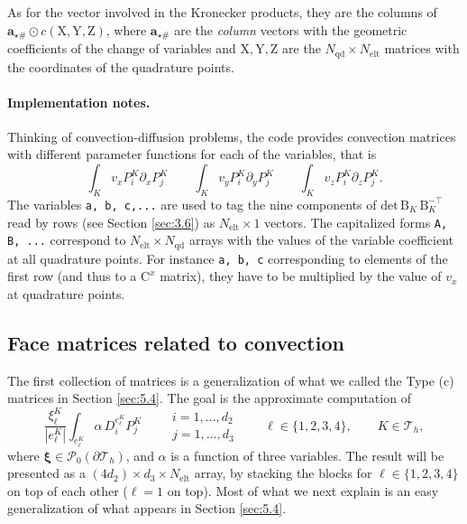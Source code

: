 \documentclass[10pt,english]{article}
\newcommand{\Nelt}{{N_{\mathrm{elt}}}}
\newcommand{\Nnd}{{N_{\mathrm{qd}}}}
\begin{document}
As for the vector involved in the Kronecker products, they are the columns of $\mathbf a_{\star\#} \odot c(\mathrm X,\mathrm Y,\mathrm Z)$, where $\mathbf a_{\star\#}$ are the {\em column} vectors with the geometric coefficients of the change of variables and $\mathrm X,\mathrm Y,\mathrm Z$ are the $\Nnd\times\Nelt$ matrices with the coordinates of the quadrature points.

\paragraph{Implementation notes.}
Thinking of convection-diffusion problems, the code provides convection matrices with different parameter functions for each of the variables, that is
\[
\int_K v_x P_i^K \partial_x P_j^K \qquad \int_K v_y P_i^K \partial_y P_j^K\qquad \int_K v_z P_i^K \partial_z P_j^K.
\]
The variables {\tt a, b, c,...} are used to tag the nine components of $\mathrm{det}\,\mathrm B_K\, \mathrm B_K^{-\top}$ read by rows (see Section \ref{sec:3.6}) as $\Nelt\times 1$ vectors. The capitalized forms {\tt A, B, ...} correspond to $\Nelt\times\Nnd$ arrays with the values of the variable coefficient at all quadrature points. For instance {\tt a, b, c} corresponding to elements of the first row (and thus to a $\mathrm C^x$ matrix), they have to be multiplied by the value of $v_x$ at quadrature points.




\subsection{Face matrices related to convection}

The first collection of matrices is a generalization of what we called the Type (c) matrices in Section \ref{sec:5.4}. The goal is the approximate computation of
\[
\frac{\xi^K_\ell}{|e^K_\ell|} \int_{e^K_\ell}\alpha\, D_i^{e^K_\ell} P_j^K \qquad \begin{array}{c} i=1,\ldots,d_2\\ j=1,\ldots,d_3\end{array}\qquad \ell\in \{1,2,3,4\}, \qquad K \in \mathcal T_h,
\]
where $\boldsymbol\xi\in \mathcal P_0(\partial \mathcal T_h)$, and $\alpha$ is a function of three variables. The result will be presented as a $(4d_2)\times d_3\times \Nelt$ array, by stacking the blocks for $\ell\in\{1,2,3,4\}$ on top of each other ($\ell=1$ on top). Most of what we next explain is an easy generalization of what appears in Section \ref{sec:5.4}.
\end{document}
